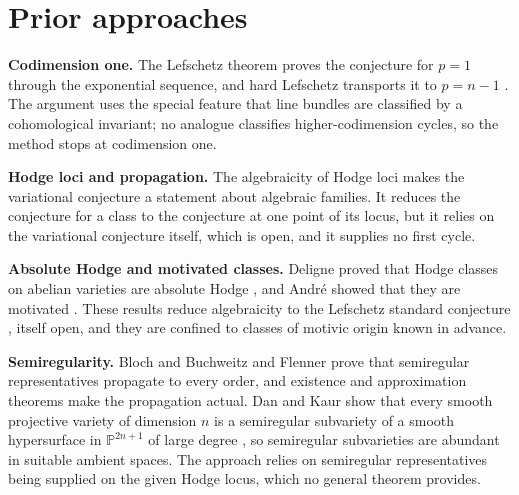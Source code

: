 \documentclass[10pt,twocolumn]{article}
\begin{document}
\hypertarget{prior-approaches}{%
\section{Prior approaches}\label{prior-approaches}}

\textbf{Codimension one.} The Lefschetz theorem proves the conjecture
for \(p=1\) through the exponential sequence, and hard Lefschetz
transports it to \(p=n-1\) \cite{lefschetz1924}. The argument uses the
special feature that line bundles are classified by a cohomological
invariant; no analogue classifies higher-codimension cycles, so the
method stops at codimension one.

\textbf{Hodge loci and propagation.} The algebraicity of Hodge loci
\cite{cdk1995} makes the variational conjecture \cite{grothendieck1966}
a statement about algebraic families. It reduces the conjecture for a
class to the conjecture at one point of its locus, but it relies on the
variational conjecture itself, which is open, and it supplies no first
cycle.

\textbf{Absolute Hodge and motivated classes.} Deligne proved that Hodge
classes on abelian varieties are absolute Hodge \cite{deligne1982}, and
André showed that they are motivated \cite{andre1996}. These results
reduce algebraicity to the Lefschetz standard conjecture
\cite{kleiman1968}, itself open, and they are confined to classes of
motivic origin known in advance.

\textbf{Semiregularity.} Bloch \cite{bloch1972} and Buchweitz and
Flenner \cite{bf2003} prove that semiregular representatives propagate
to every order, and existence and approximation theorems make the
propagation actual. Dan and Kaur show that every smooth projective
variety of dimension \(n\) is a semiregular subvariety of a smooth
hypersurface in \(\mathbb{P}^{2n+1}\) of large degree
\cite{dankaur2016}, so semiregular subvarieties are abundant in suitable
ambient spaces. The approach relies on semiregular representatives being
supplied on the given Hodge locus, which no general theorem provides.
\end{document}
